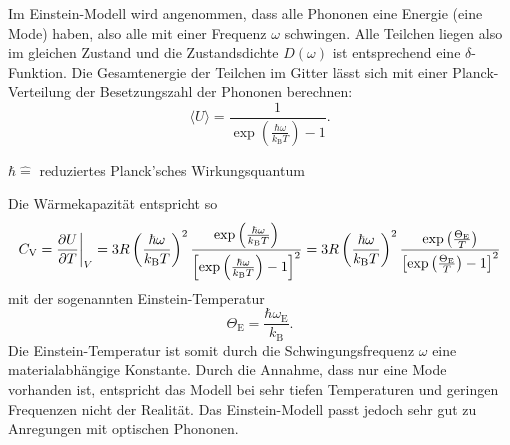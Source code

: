 Im Einstein-Modell wird angenommen, dass alle Phononen eine Energie (eine Mode) haben, also alle mit einer Frequenz $\omega$ schwingen.
Alle Teilchen liegen also im gleichen Zustand und die Zustandsdichte $D(\omega)$ ist entsprechend eine $\delta$-Funktion.
Die Gesamtenergie der Teilchen im Gitter lässt sich mit einer Planck-Verteilung der Besetzungszahl der Phononen berechnen:
\begin{equation*}
	\langle U \rangle = \frac{1}{\exp{\left( \frac{ \hbar \omega }{ k_{\text{B}} T } \right)} - 1}.
\end{equation*}
\begin{center}
	\tiny{$\hbar \widehat{=}$ reduziertes Planck'sches Wirkungsquantum}
\end{center}

Die Wärmekapazität entspricht so
\begin{equation*}
	C_{\text{V}} = \frac{\partial U}{\partial T} \bigg{\vert}_{V} = 3 R \left( \frac{\hbar \omega}{k_{\text{B}} T} \right)^2
	\frac{ \exp{\left( \frac{ \hbar \omega }{ k_{\text{B}} T } \right)} }{ \left[ \exp{\left( \frac{ \hbar \omega }{ k_{\text{B}} T } \right)} - 1 \right]^2 } =
	3 R \left( \frac{\hbar \omega}{k_{\text{B}} T} \right)^2
	\frac{ \exp{\left( \frac{ \Theta_{\text{E}} }{ T } \right)} }{ \left[ \exp{\left( \frac{ \Theta_{\text{E}} }{ T } \right)} - 1 \right]^2 }
\end{equation*}
mit der sogenannten Einstein-Temperatur
\begin{equation*}
	\Theta_{\text{E}} = \frac{\hbar \omega_{\text{E}}}{k_{\text{B}}}.
\end{equation*}
Die Einstein-Temperatur ist somit durch die Schwingungsfrequenz $\omega$ eine materialabhängige Konstante.
Durch die Annahme, dass nur eine Mode vorhanden ist, entspricht das Modell bei sehr tiefen Temperaturen und geringen Frequenzen nicht der Realität.
Das Einstein-Modell passt jedoch sehr gut zu Anregungen mit optischen Phononen.


